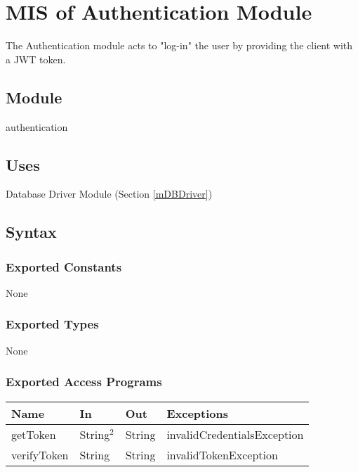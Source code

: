 \documentclass[12pt, titlepage]{article}
\begin{document}
\newpage

\section{MIS of Authentication Module} \label{mAuthentication} 
The Authentication module acts to "log-in" the user by providing the client with a JWT token.

\subsection{Module}

authentication

\subsection{Uses}

Database Driver Module (Section \ref{mDBDriver}) 

\subsection{Syntax}

\subsubsection{Exported Constants}

None

\subsubsection{Exported Types}

None

\subsubsection{Exported Access Programs}

\begin{center}
\begin{tabular}{p{5cm} p{3cm} p{3cm} p{5cm}}
\hline
\textbf{Name} & \textbf{In} & \textbf{Out} & \textbf{Exceptions} \\
\hline
getToken & String$^2$ & String & invalidCredentialsException \\
verifyToken & String & String & invalidTokenException \\
\hline
\end{tabular}
\end{center}
\end{document}
